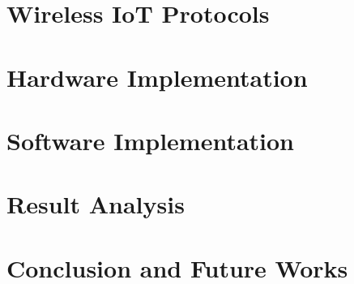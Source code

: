 \documentclass[Times,12pt,oneside,openany,print,index]{report}
\begin{document}


\chapter{Wireless IoT Protocols}\label{Wireless IoT Protocols}



\chapter{Hardware Implementation}\label{Hardware}



\chapter{Software Implementation}\label{Software}



\chapter{Result Analysis}\label{Result}



\chapter{Conclusion and Future Works}\label{Conclusion}




\printbibliography %
{}




\end{document}
